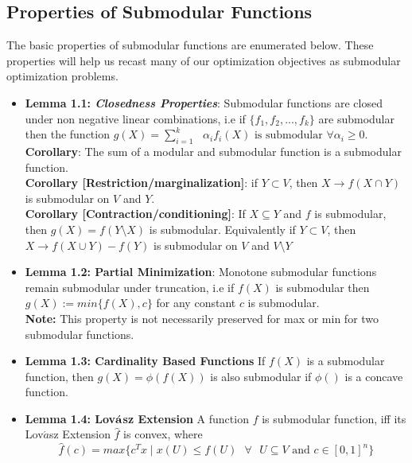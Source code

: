 \subsection{Properties of Submodular Functions}
The basic properties of submodular functions are enumerated below. These properties will help us recast many of our optimization objectives as submodular optimization problems.\\

\begin{itemize}
 \item {\bf Lemma 1.1: \it Closedness Properties}: Submodular functions are closed under non negative linear combinations, i.e if $\{f_1,f_2,...,f_k\}$ are submodular then the function $g(X) = \sum\limits_{i=1}^k\text{ } \alpha_if_i(X) \text{ is submodular }\forall \alpha_i \geq 0$.\\
 
 {\bf Corollary}: The sum of a modular and submodular function is a submodular function.\\
 
 {\bf Corollary [Restriction/marginalization]}: if $Y\subset V$, then $X\rightarrow f(X \cap Y)$ is submodular on $V$ and $Y$.\\
 
 {\bf Corollary [Contraction/conditioning]}: If $X \subseteq Y$ and $f$ is submodular, then $g(X) = f(Y\setminus X)$ is submodular. Equivalently if $Y\subset V$, then $X\rightarrow f(X \cup Y) - f(Y)$ is submodular on $V$ and $V\setminus Y$\\
 
 \item {\bf Lemma 1.2: Partial Minimization}: Monotone submodular functions remain submodular under truncation, i.e if $f(X)$ is submodular then $g(X) := min\{f(X),c\}$ for any constant $c$ is submodular.\\
 
 {\bf Note:} This property is not necessarily preserved for max or min for two submodular functions.\\
 
 \item{\bf Lemma 1.3: Cardinality Based Functions} If $f(X)$ is a submodular function, then $g(X) = \phi(f(X))$ is also submodular if $\phi()$ is a concave function.\\
 
 \item{\bf Lemma 1.4: Lov$\acute{\bf a}$sz Extension} A function $f$ is submodular function, iff its Lov$\acute{a}$sz Extension $\hat{f}$ is convex, where
 \[
  \hat{f}(c) = max\{c^Tx \mid x(U) \leq f(U) \text{ } \forall \text{ } U \subseteq V \text{ and } c\in[0,1]^n\}
 \]

\end{itemize}